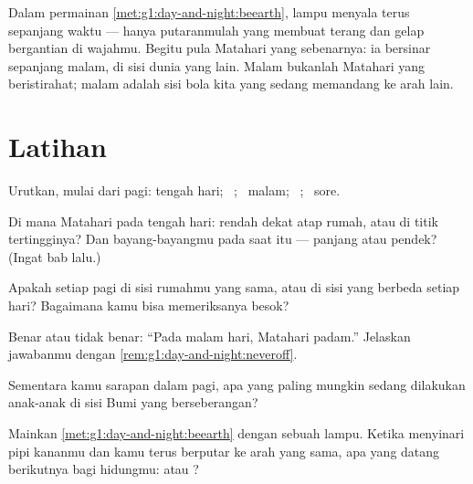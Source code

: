 \begin{remark}\label{rem:g1:day-and-night:neveroff}
Dalam permainan \cref{met:g1:day-and-night:beearth}, lampu menyala
terus sepanjang waktu --- hanya putaranmulah yang membuat terang dan
gelap bergantian di wajahmu. Begitu pula Matahari yang sebenarnya: ia
bersinar sepanjang malam, di sisi dunia yang lain. Malam bukanlah
Matahari yang beristirahat; malam adalah sisi bola kita yang sedang
memandang ke arah lain.
\end{remark}

\section{Latihan}

\begin{exercise}[$\star$]\label{exo:g1:day-and-night:1}
Urutkan, mulai dari pagi: tengah hari; \ ; \ malam;
\ ; \ sore.
\end{exercise}

\begin{exercise}[$\star$]\label{exo:g1:day-and-night:2}
Di mana Matahari pada tengah hari: rendah dekat atap rumah, atau di
titik tertingginya? Dan bayang-bayangmu pada saat itu --- panjang atau
pendek? (Ingat bab lalu.)
\end{exercise}

\begin{exercise}[$\star$]\label{exo:g1:day-and-night:3}
Apakah  setiap pagi di sisi rumahmu yang sama, atau di
sisi yang berbeda setiap hari? Bagaimana kamu bisa memeriksanya besok?
\end{exercise}

\begin{exercise}[$\star$]\label{exo:g1:day-and-night:4}
Benar atau tidak benar: ``Pada malam hari, Matahari padam.'' Jelaskan
jawabanmu dengan \cref{rem:g1:day-and-night:neveroff}.
\end{exercise}

\begin{exercise}[$\star$]\label{exo:g1:day-and-night:5}
Sementara kamu sarapan dalam  pagi, apa yang paling mungkin
sedang dilakukan anak-anak di sisi Bumi yang berseberangan?
\end{exercise}

\begin{exercise}[$\star$]\label{exo:g1:day-and-night:6}
Mainkan \cref{met:g1:day-and-night:beearth} dengan sebuah lampu.
Ketika  menyinari pipi kananmu dan kamu terus berputar ke arah
yang sama, apa yang datang berikutnya bagi hidungmu: 
atau ?
\end{exercise}

